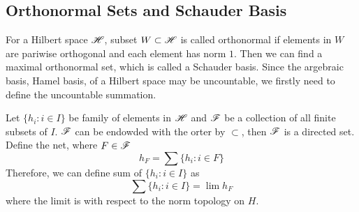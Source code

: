 \documentclass[a4paper,11pt]{report}
\begin{document}
\subsection{Orthonormal Sets and Schauder Basis}

For a Hilbert space $\mathscr{H}$, subset $W \subset \mathscr{H}$ is called orthonormal if  elements in $W$ are pariwise orthogonal and each element has norm $1$. Then we can find a maximal orthonormal set, which is called a Schauder basis. Since the argebraic basis, Hamel basis, of a Hilbert space may be uncountable, we firstly need to define the uncountable summation.

\begin{defn}
	Let $\{h_i \colon i \in I\}$ be family of elements in $\mathscr{H}$ and $\mathscr{F}$ be a collection of all finite subsets of $I$. $\mathscr{F}$ can be endowded with the orter by $\subset$, then $\mathscr{F}$ is a directed set. Define the net, where $F \in \mathscr{F}$
	\begin{equation*}
		h_F = \sum \{h_i \colon i \in F\}
	\end{equation*}
	Therefore, we can define sum of $\{h_i \colon i \in I\}$ as
	\begin{equation*}
		\sum \{h_i \colon i \in I\} = \lim h_F
	\end{equation*}
	where the limit is with respect to the norm topology on $H$.
\end{defn}
\end{document}
